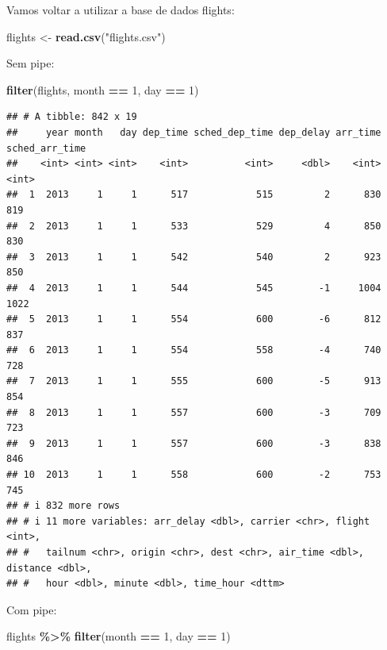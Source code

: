 \documentclass[
]{book}
\newenvironment{Shaded}{\begin{snugshade}}{\end{snugshade}}
\newcommand{\DecValTok}[1]{\textcolor[rgb]{0.00,0.00,0.81}{#1}}
\newcommand{\FunctionTok}[1]{\textcolor[rgb]{0.13,0.29,0.53}{\textbf{#1}}}
\newcommand{\NormalTok}[1]{#1}
\newcommand{\OtherTok}[1]{\textcolor[rgb]{0.56,0.35,0.01}{#1}}
\newcommand{\SpecialCharTok}[1]{\textcolor[rgb]{0.81,0.36,0.00}{\textbf{#1}}}
\newcommand{\StringTok}[1]{\textcolor[rgb]{0.31,0.60,0.02}{#1}}
\begin{document}
Vamos voltar a utilizar a base de dados flights:

\begin{Shaded}
\begin{Highlighting}[]
\NormalTok{flights }\OtherTok{\textless{}{-}} \FunctionTok{read.csv}\NormalTok{(}\StringTok{"flights.csv"}\NormalTok{)}
\end{Highlighting}
\end{Shaded}

Sem pipe:

\begin{Shaded}
\begin{Highlighting}[]
\FunctionTok{filter}\NormalTok{(flights, month }\SpecialCharTok{==} \DecValTok{1}\NormalTok{, day }\SpecialCharTok{==} \DecValTok{1}\NormalTok{)}
\end{Highlighting}
\end{Shaded}

\begin{verbatim}
## # A tibble: 842 x 19
##     year month   day dep_time sched_dep_time dep_delay arr_time sched_arr_time
##    <int> <int> <int>    <int>          <int>     <dbl>    <int>          <int>
##  1  2013     1     1      517            515         2      830            819
##  2  2013     1     1      533            529         4      850            830
##  3  2013     1     1      542            540         2      923            850
##  4  2013     1     1      544            545        -1     1004           1022
##  5  2013     1     1      554            600        -6      812            837
##  6  2013     1     1      554            558        -4      740            728
##  7  2013     1     1      555            600        -5      913            854
##  8  2013     1     1      557            600        -3      709            723
##  9  2013     1     1      557            600        -3      838            846
## 10  2013     1     1      558            600        -2      753            745
## # i 832 more rows
## # i 11 more variables: arr_delay <dbl>, carrier <chr>, flight <int>,
## #   tailnum <chr>, origin <chr>, dest <chr>, air_time <dbl>, distance <dbl>,
## #   hour <dbl>, minute <dbl>, time_hour <dttm>
\end{verbatim}

Com pipe:

\begin{Shaded}
\begin{Highlighting}[]
\NormalTok{flights }\SpecialCharTok{\%\textgreater{}\%} \FunctionTok{filter}\NormalTok{(month }\SpecialCharTok{==} \DecValTok{1}\NormalTok{, day }\SpecialCharTok{==} \DecValTok{1}\NormalTok{)}
\end{Highlighting}
\end{Shaded}
\end{document}
